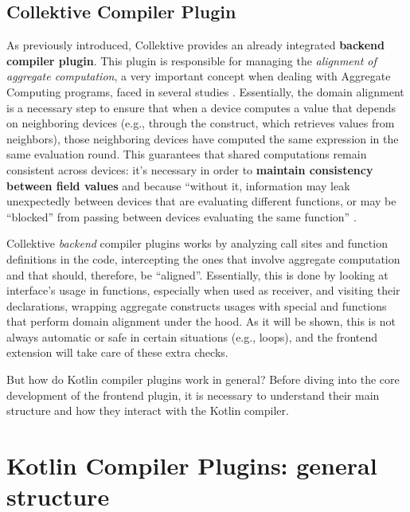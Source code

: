 \documentclass[12pt,a4paper,openright,twoside]{book}
\begin{document}
\subsection{Collektive Compiler Plugin}

As previously introduced, Collektive provides an already integrated
\textbf{backend compiler plugin}. This plugin is responsible for managing the
\emph{alignment of aggregate computation}, a very important concept when dealing
with Aggregate Computing programs, faced in several studies
\cite{DBLP:conf/forte/DamianiVPB15} \cite{DBLP:conf/saso/AudritoDVC16}.
%
Essentially, the domain alignment is a necessary step to ensure that when a
device computes a value that depends on neighboring devices (e.g., through the
 construct, which retrieves values from neighbors), those
neighboring devices have computed the same expression in the same evaluation
round. This guarantees that shared computations remain consistent across
devices: it's necessary in order to \textbf{maintain consistency between field
values} and  because ``without it, information
may leak unexpectedly between devices that are evaluating different functions,
or may be “blocked” from passing between devices evaluating the same function''
\cite{DBLP:conf/forte/DamianiVPB15}.

Collektive \emph{backend} compiler plugins works by analyzing call sites and
function definitions in the code, intercepting the ones that involve aggregate
computation and that should, therefore, be ``aligned''. Essentially, this is
done by looking at  interface's usage in functions,
especially when used as receiver, and visiting their declarations, wrapping
aggregate constructs usages with special  and
 functions that perform domain alignment under the hood.
%
As it will be shown, this is not always automatic or safe in certain situations
(e.g., loops), and the frontend extension will take care of these extra checks. 

But how do Kotlin compiler plugins work in general? Before diving into the 
core development of the frontend plugin, it is necessary to understand their
main structure and how they interact with the Kotlin compiler.

\section{Kotlin Compiler Plugins: general structure} 
\end{document}

